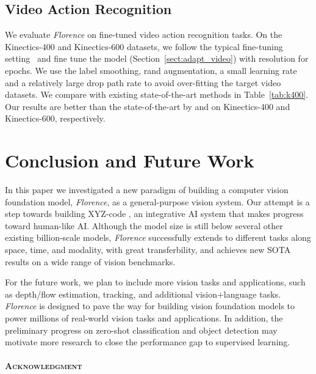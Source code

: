 \documentclass{article}
\begin{document}
\subsection{Video Action Recognition}

We evaluate \emph{Florence} on fine-tuned video action recognition tasks. On the Kinectics-400 and
Kinectics-600 datasets, we follow the typical fine-tuning setting~\cite{liu2021video} and fine tune
the model (Section~\ref{sect:adapt_video}) with  resolution for  epochs. We use
the label smoothing, rand augmentation, a small learning rate  and a relatively large drop
path rate  to avoid over-fitting the target video datasets. We compare with existing
state-of-the-art methods in Table~\ref{tab:k400}. Our results are better than the state-of-the-art
by  and  on Kinectics-400 and Kinectics-600, respectively.




\section{Conclusion and Future Work}

In this paper we investigated a new paradigm of building a computer vision foundation model, \emph{Florence}, as a general-purpose vision system. Our attempt is a step towards building XYZ-code \cite{XYZ-code}, an integrative AI system that makes progress toward human-like AI. Although the model size is still below several other existing billion-scale models, \emph{Florence} successfully extends to different tasks along space, time, and modality, with great transferbility, and achieves new SOTA results on a wide range of vision benchmarks.

For the future work, we plan to include more vision tasks and applications, such as depth/flow estimation, tracking, and additional vision+language tasks. \emph{Florence} is designed to pave the way for building vision foundation models to power millions of real-world vision tasks and applications. In addition, the preliminary progress on zero-shot classification and object detection may motivate more research to close the performance gap to supervised learning.

\noindent\paragraph{\textsc{Acknowledgment}}\mbox{}\\
\end{document}
